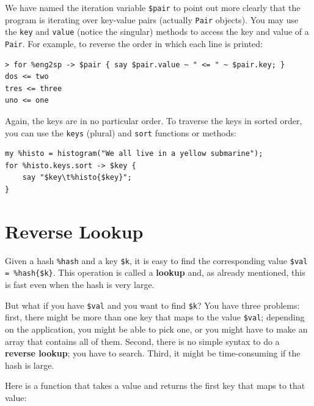 We have named the iteration variable \verb'$pair' to point 
out more clearly that the program is iterating over key-value 
pairs (actually \verb'Pair' objects). You may use the 
{\tt key} and {\tt value} (notice the singular) methods to 
access the key and value of a \verb'Pair'. For example, to 
reverse the order in which each line is printed:

\begin{verbatim}
> for %eng2sp -> $pair { say $pair.value ~ " <= " ~ $pair.key; }
dos <= two
tres <= three
uno <= one
\end{verbatim}

Again, the keys are in no particular order.  To traverse 
the keys in sorted order, you can use the {\tt keys} 
(plural) and {\tt sort} functions or methods:

\begin{verbatim}
my %histo = histogram("We all live in a yellow submarine");
for %histo.keys.sort -> $key {
    say "$key\t%histo{$key}";
}
\end{verbatim}



\section{Reverse Lookup}
\label{raise}

Given a hash \verb'%hash' and a key \verb'$k', it is easy to
find the corresponding value \verb'$val = %hash{$k}'.  
This operation is called a {\bf lookup} and, as already 
mentioned, this is fast even when the hash is very large.

But what if you have \verb'$val' and you want to find 
\verb'$k'? You have three problems: first, there might be 
more than one key that maps to the value \verb'$val'; depending 
on the application, you might be able to pick one, or you 
might have to make an array that contains all of them.  
Second, there is no simple syntax to do a {\bf reverse lookup}; 
you have to search. Third, it might be time-consuming if 
the hash is large.

Here is a function that takes a value and returns the first
key that maps to that value:

